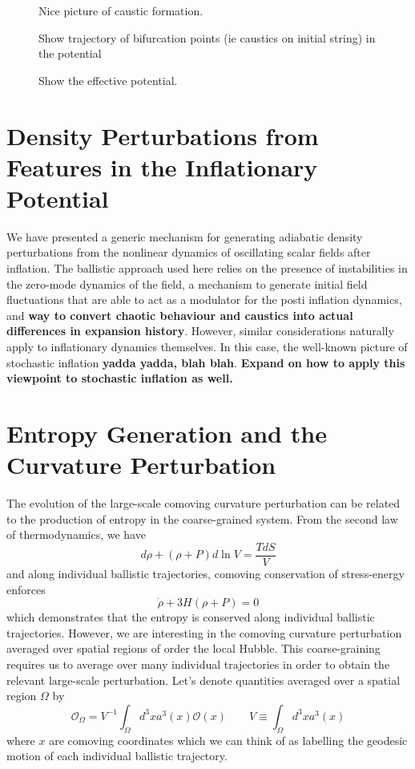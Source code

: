 \documentclass[11pt,a4paper]{article}
\begin{document}
\begin{figure}
  \caption{Nice picture of caustic formation.}
\end{figure}

\begin{figure}
  \caption{Show trajectory of bifurcation points (ie caustics on initial string) in the potential}
\end{figure}

\begin{figure}
  \caption{Show the effective potential.}
\end{figure}

\section{Density Perturbations from Features in the Inflationary Potential}
We have presented a generic mechanism for generating adiabatic density perturbations from the nonlinear dynamics of oscillating scalar fields after inflation.
The ballistic approach used here relies on the presence of instabilities in the zero-mode dynamics of the field,
a mechanism to generate initial field fluctuations that are able to act as a modulator for the posti inflation dynamics,
and {\bf way to convert chaotic behaviour and caustics into actual differences in expansion history}.
However, similar considerations naturally apply to inflationary dynamics themselves.
In this case, the well-known picture of stochastic inflation {\bf yadda yadda, blah blah}.
{\bf Expand on how to apply this viewpoint to stochastic inflation as well.}



\section{Entropy Generation and the Curvature Perturbation}
The evolution of the large-scale comoving curvature perturbation can be related to the production of entropy in the coarse-grained system.
From the second law of thermodynamics, we have
\begin{equation}
  d\rho + (\rho+P)d\ln V = \frac{TdS}{V}
\end{equation}
and along individual ballistic trajectories, comoving conservation of stress-energy enforces
\begin{equation}
  \dot{\rho} + 3H(\rho+P) = 0
\end{equation}
which demonstrates that the entropy is conserved along individual ballistic trajectories.
However, we are interesting in the comoving curvature perturbation averaged over spatial regions of order the local Hubble.
This coarse-graining requires us to average over many individual trajectories in order to obtain the relevant large-scale perturbation.
Let's denote quantities averaged over a spatial region $\Omega$ by
\begin{equation}
  \mathcal{O}_\Omega = V^{-1}\int_\Omega d^3x a^3(x)\mathcal{O}(x) \qquad V \equiv \int_\Omega d^3x a^3(x)
\end{equation}
where $x$ are comoving coordinates which we can think of as labelling the geodesic motion of each individual ballistic trajectory.
\end{document}
